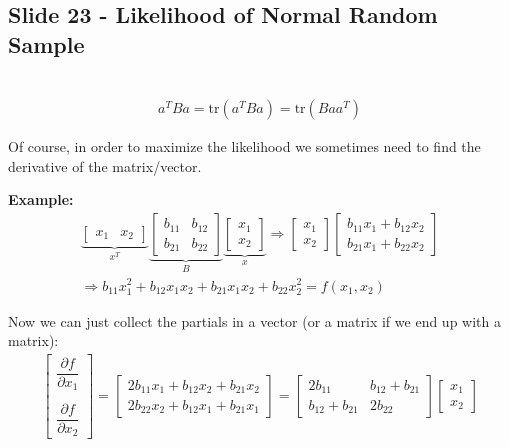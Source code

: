 \subsection{Slide 23 - Likelihood of Normal Random Sample}\hfill\\
\begin{equation*}
  \begin{gathered}
    a^TBa = \text{tr}(a^TBa) = \text{tr}(Baa^T)
  \end{gathered}
\end{equation*}
\par\bigskip
\noindent Of course, in order to maximize the likelihood we sometimes need to find the derivative of the matrix/vector.
\par\bigskip
\noindent\textbf{Example:}
\begin{equation*}
  \begin{gathered}
    \underbrace{\begin{bmatrix}x_1& x_2\end{bmatrix}}_{\text{$x^T$}}\underbrace{\begin{bmatrix}b_{11}&b_{12}\\b_{21}&b_{22}\end{bmatrix}}_{\text{$B$}}\underbrace{\begin{bmatrix}x_1\\x_2\end{bmatrix}}_{\text{$x$}}\Rightarrow \begin{bmatrix}x_1\\x_2\end{bmatrix}\begin{bmatrix}b_{11}x_1+b_{12}x_2\\b_{21}x_1+b_{22}x_2\end{bmatrix}\\
    \Rightarrow b_{11}x_1^2+b_{12}x_1x_2+b_{21}x_1x_2+b_{22}x_2^2 = f(x_1,x_2)
  \end{gathered}
\end{equation*}\par
\noindent Now we can just collect the partials in a vector (or a matrix if we end up with a matrix):
\begin{equation*}
  \begin{gathered}
    \begin{bmatrix}\dfrac{\partial f}{\partial x_1}\\\\\dfrac{\partial f}{\partial x_2}\end{bmatrix} = \begin{bmatrix}2b_{11}x_1+b_{12}x_2+b_{21}x_2\\2b_{22}x_2+b_{12}x_1+b_{21}x_1\end{bmatrix} = \begin{bmatrix}2b_{11}& b_{12}+b_{21}\\b_{12}+b_{21}&2b_{22}\end{bmatrix}\begin{bmatrix}x_1\\x_2\end{bmatrix}
  \end{gathered}
\end{equation*}
\par\bigskip
